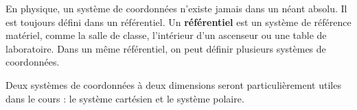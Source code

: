 En physique, un système de coordonnées n'existe jamais dans un néant absolu.
Il est toujours défini dans un référentiel.  Un \textbf{référentiel} est un
système de référence matériel, comme la salle de classe, l'intérieur d'un
ascenseur ou une table de laboratoire.  Dans un même référentiel, on peut
définir plusieurs systèmes de coordonnées.

Deux systèmes de coordonnées à deux dimensions seront particulièrement utiles
dans le cours : le système cartésien et le système polaire.

\begin{marginfigure}
  
\end{marginfigure}


\exemple{

}

